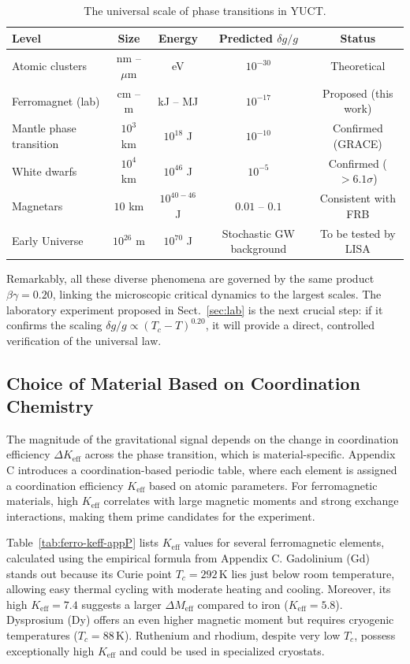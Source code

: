 \documentclass[12pt]{article}
\theoremstyle{remark}
\newcommand{\Keff}{K_{\mathrm{eff}}}
\begin{document}
	\begin{table}[htbp]
		\centering
		\caption{The universal scale of phase transitions in YUCT.}
		\label{tab:scale}
		\small
		\begin{tabular}{lcccc}
			\toprule
			\textbf{Level} & \textbf{Size} & \textbf{Energy} & \textbf{Predicted } \(\delta g/g\) & \textbf{Status} \\
			\midrule
			Atomic clusters & nm – $\mu$m & eV & $10^{-30}$ & Theoretical \\
			Ferromagnet (lab) & cm – m & kJ – MJ & $10^{-17}$ & Proposed (this work) \\
			Mantle phase transition & $10^3$ km & $10^{18}$ J & $10^{-10}$ & Confirmed (GRACE) \\
			White dwarfs & $10^4$ km & $10^{46}$ J & $10^{-5}$ & Confirmed ($>6.1\sigma$) \\
			Magnetars & $10$ km & $10^{40-46}$ J & $0.01$ – $0.1$ & Consistent with FRB \\
			Early Universe & $10^{26}$ m & $10^{70}$ J & Stochastic GW background & To be tested by LISA \\
			\bottomrule
		\end{tabular}
	\end{table}
	
	Remarkably, all these diverse phenomena are governed by the same product $\beta\gamma = 0.20$, linking the microscopic critical dynamics to the largest scales. The laboratory experiment proposed in Sect.~\ref{sec:lab} is the next crucial step: if it confirms the scaling $\delta g/g \propto (T_c - T)^{0.20}$, it will provide a direct, controlled verification of the universal law.
	
	\subsection{Choice of Material Based on Coordination Chemistry}
	\label{subsec:material-choice}
	
	The magnitude of the gravitational signal depends on the change in coordination efficiency \(\Delta \Keff\) across the phase transition, which is material-specific. Appendix C introduces a coordination-based periodic table, where each element is assigned a coordination efficiency \(\Keff\) based on atomic parameters. For ferromagnetic materials, high \(\Keff\) correlates with large magnetic moments and strong exchange interactions, making them prime candidates for the experiment.
	
	Table~\ref{tab:ferro-keff-appP} lists \(\Keff\) values for several ferromagnetic elements, calculated using the empirical formula from Appendix C. Gadolinium (Gd) stands out because its Curie point \(T_c = 292\,\mathrm{K}\) lies just below room temperature, allowing easy thermal cycling with moderate heating and cooling. Moreover, its high \(\Keff = 7.4\) suggests a larger \(\Delta M_{\mathrm{eff}}\) compared to iron (\(\Keff = 5.8\)). Dysprosium (Dy) offers an even higher magnetic moment but requires cryogenic temperatures (\(T_c = 88\,\mathrm{K}\)). Ruthenium and rhodium, despite very low \(T_c\), possess exceptionally high \(\Keff\) and could be used in specialized cryostats.
	
\end{document}
